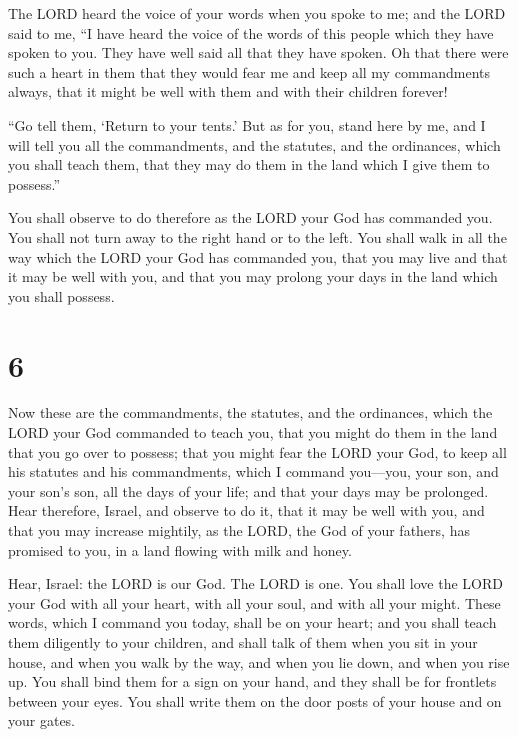  The LORD heard the voice of your words when you spoke to
me; and the LORD said to me, ``I have heard the voice of the words of
this people which they have spoken to you. They have well said all that
they have spoken.  Oh that there were such a heart in them
that they would fear me and keep all my commandments always, that it
might be well with them and with their children forever!

 ``Go tell them, `Return to your tents.'  But
as for you, stand here by me, and I will tell you all the commandments,
and the statutes, and the ordinances, which you shall teach them, that
they may do them in the land which I give them to possess.''

 You shall observe to do therefore as the LORD your God has
commanded you. You shall not turn away to the right hand or to the left.
 You shall walk in all the way which the LORD your God has
commanded you, that you may live and that it may be well with you, and
that you may prolong your days in the land which you shall possess.

\hypertarget{section-5}{%
\section{6}\label{section-5}}

 Now these are the commandments, the statutes, and the
ordinances, which the LORD your God commanded to teach you, that you
might do them in the land that you go over to possess;  that
you might fear the LORD your God, to keep all his statutes and his
commandments, which I command you---you, your son, and your son's son,
all the days of your life; and that your days may be prolonged.
 Hear therefore, Israel, and observe to do it, that it may
be well with you, and that you may increase mightily, as the LORD, the
God of your fathers, has promised to you, in a land flowing with milk
and honey.

 Hear, Israel: the LORD is our God. The LORD is one.
 You shall love the LORD your God with all your heart, with
all your soul, and with all your might.  These words, which
I command you today, shall be on your heart;  and you shall
teach them diligently to your children, and shall talk of them when you
sit in your house, and when you walk by the way, and when you lie down,
and when you rise up.  You shall bind them for a sign on
your hand, and they shall be for frontlets between your eyes.
 You shall write them on the door posts of your house and on
your gates.

